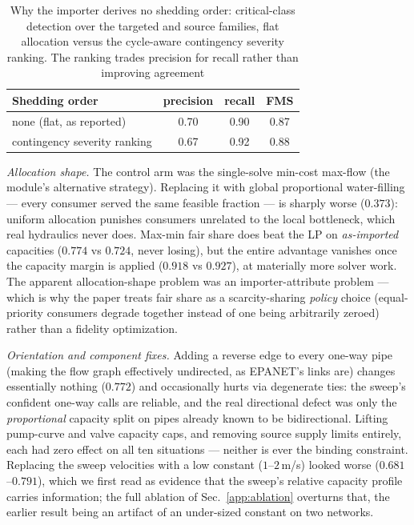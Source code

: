\documentclass[11pt]{article}
\begin{document}
\begin{table}[h]
\centering
\caption{Why the importer derives no shedding order: critical-class detection
over the targeted and source families, flat allocation versus the
cycle-aware contingency severity ranking. The ranking trades precision for recall
rather than improving agreement}\label{tab:priority}
\begin{tabular}{@{}lccc@{}}
\toprule
Shedding order & precision & recall & FMS\\
\midrule
none (flat, as reported)     & 0.70 & 0.90 & 0.87\\
contingency severity ranking & 0.67 & 0.92 & 0.88\\
\bottomrule
\end{tabular}
\end{table}

\emph{Allocation shape.} The control arm was the single-solve min-cost max-flow
(the module's alternative strategy). Replacing it with global proportional
water-filling --- every consumer served the same feasible fraction --- is sharply
worse ($0.373$): uniform allocation punishes consumers unrelated to the local
bottleneck, which real hydraulics never does. Max-min fair share does beat the LP
on \emph{as-imported} capacities ($0.774$ vs $0.724$, never losing), but the
entire advantage vanishes once the capacity margin is applied ($0.918$ vs
$0.927$), at materially more solver work. The apparent allocation-shape problem
was an importer-attribute problem --- which is why the paper treats fair share as
a scarcity-sharing \emph{policy} choice (equal-priority consumers degrade
together instead of one being arbitrarily zeroed) rather than a fidelity
optimization.

\emph{Orientation and component fixes.} Adding a reverse edge to every one-way
pipe (making the flow graph effectively undirected, as EPANET's links are)
changes essentially nothing ($0.772$) and occasionally hurts via degenerate ties:
the sweep's confident one-way calls are reliable, and the real directional defect
was only the \emph{proportional} capacity split on pipes already known to be
bidirectional. Lifting pump-curve and valve capacity caps, and removing source
supply limits entirely, each had zero effect on all ten situations --- neither is
ever the binding constraint. Replacing the sweep velocities with a low constant
($1$--$2$\,m/s) looked worse ($0.681$--$0.791$), which we first read as evidence
that the sweep's relative capacity profile carries information; the full ablation
of Sec.~\ref{app:ablation} overturns that, the earlier result being an artifact
of an under-sized constant on two networks.
\end{document}
